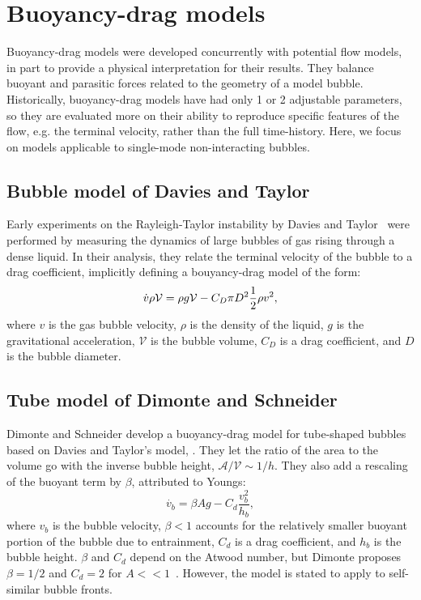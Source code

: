 \section{Buoyancy-drag models}

Buoyancy-drag models were developed concurrently with potential flow models, in part to provide a physical interpretation for their results.
They balance buoyant and parasitic forces related to the geometry of a model bubble.
Historically, buoyancy-drag models have had only 1 or 2 adjustable parameters, so they are evaluated more on their ability to reproduce specific features of the flow, e.g. the terminal velocity, rather than the full time-history.
Here, we focus on models applicable to single-mode non-interacting bubbles.

\subsection{Bubble model of Davies and Taylor}

Early experiments on the Rayleigh-Taylor instability by Davies and Taylor~\cite{Davies1950a} were performed by measuring the dynamics of large bubbles of gas rising through a dense liquid.
In their analysis, they relate the terminal velocity of the bubble to a drag coefficient, implicitly defining a bouyancy-drag model of the form:
\begin{equation} \elabel{dtbd}
\dot{v} \rho \mathcal{V} = \rho g \mathcal{V} - C_D \pi D^2 \frac{1}{2} \rho v^2,
\end{equation}
where $v$ is the gas bubble velocity,
$\rho$ is the density of the liquid,
$g$ is the gravitational acceleration,
$\mathcal{V}$ is the bubble volume,
$C_D$ is a drag coefficient, and
$D$ is the bubble diameter.


\subsection{Tube model of Dimonte and Schneider}

Dimonte and Schneider develop a buoyancy-drag model for tube-shaped bubbles~\cite{Dimonte1996,Dimonte2000a} based on Davies and Taylor's model, .
They let the ratio of the area to the volume go with the inverse bubble height, $\mathcal{A} / \mathcal{V} \sim 1/h$.
They also add a rescaling of the buoyant term by $\beta$, attributed to Youngs:
\begin{equation}
\dot{v_b}  = \beta A g - C_d \frac{v_b^2}{h_b}, 
\end{equation}
where $v_b$ is the bubble velocity,
$\beta < 1$ accounts for the relatively smaller buoyant portion of the bubble due to entrainment,
$C_d$ is a drag coefficient, and
$h_b$ is the bubble height.
$\beta$ and $C_d$ depend on the Atwood number, but Dimonte proposes $\beta = 1/2$ and $C_d = 2$ for $A << 1$~\cite{Dimonte2000}.
However, the model is stated to apply to self-similar bubble fronts.

